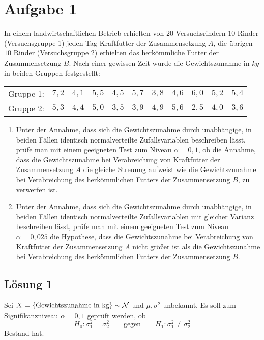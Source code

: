 \documentclass[main.tex]{subfiles}
\begin{document}
\section{Aufgabe 1}
In einem landwirtschaftlichen Betrieb erhielten von $20$ Versuchsrindern $10$ Rinder (Versuchsgruppe 1) jeden Tag Kraftfutter der Zusammensetzung $A$, die übrigen $10$ Rinder (Versuchsgruppe 2) erhielten das herkömmliche Futter der Zusammensetzung $B$. Nach einer gewissen Zeit wurde die Gewichtszunahme in $kg$ in beiden Gruppen festgestellt:
\begin{center}
	\begin{tabular}{ccccccccccc}
		Gruppe 1: & $7,2$ & $4,1$ & $5,5$ & $4,5$ & $5,7$ & $3,8$ & $4,6$ & $6,0$ & $5,2$ & $5,4$ \\
		Gruppe 2: & $5,3$ & $4,4$ & $5,0$ & $3,5$ & $3,9$ & $4,9$ & $5,6$ & $2,5$ & $4,0$ & $3,6$
	\end{tabular}
\end{center}
\begin{enumerate}
\item Unter der Annahme, dass sich die Gewichtszunahme durch unabhängige, in beiden Fällen identisch normalverteilte Zufallsvariablen beschreiben lässt, prüfe man mit einem geeigneten Test zum Niveau $\alpha = 0,1$, ob die Annahme, dass die Gewichtszunahme bei Verabreichung von Kraftfutter der Zusammensetzung $A$ die gleiche Streuung aufweist wie die Gewichtszunahme bei Verabreichung des herkömmlichen Futters der Zusammensetzung $B$, zu verwerfen ist.
\item Unter der Annahme, dass sich die Gewichtszunahme durch unabhängige, in beiden Fällen identisch normalverteilte Zufallsvariablen mit gleicher Varianz beschreiben lässt, prüfe man mit einem geeigneten Test zum Niveau $\alpha = 0,025$ die Hypothese, dass die Gewichtszunahme bei Verabreichung von Kraftfutter der Zusammensetzung $A$ nicht größer ist als die Gewichtszunahme bei Verabreichung des herkömmlichen Futters der Zusammensetzung $B$.
\end{enumerate}

\subsection{Lösung 1}

Sei $X =\{\text{Gewichtszunahme in kg}\} \sim \mathcal{N}$ und $\mu, \sigma^2$ unbekannt.
Es soll zum Signifikanzniveau $\alpha = 0,1$ geprüft werden, ob
$$
H_0: \sigma_1^2 = \sigma_2^2 \qquad \text{gegen} \qquad H_1: \sigma_1^2 \neq \sigma_2^2
$$
Bestand hat.
\end{document}
